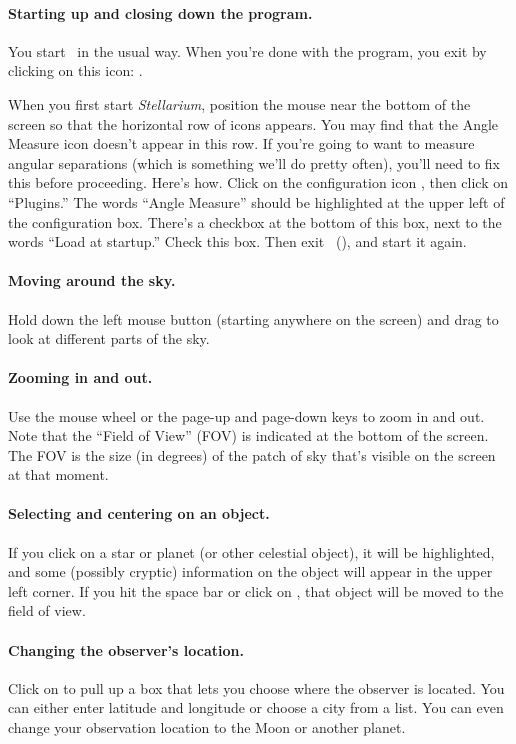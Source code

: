 \paragraph{Starting up and closing down the program.}
You start \stellarium\ in the usual way.
When you're done with the program, you exit by
clicking on this icon: .

When you first start \textit{Stellarium}, position the mouse
near the bottom of the screen so that the horizontal
row of icons appears. You may find that the
Angle Measure icon  doesn't appear in this row.
If you're going to want to measure angular separations (which is
something we'll do pretty often), you'll need to fix this before proceeding.
Here's how. Click on the configuration icon , then click on
``Plugins.'' The words ``Angle Measure'' should be highlighted at the 
upper left of the configuration box. There's a checkbox at the bottom
of this box, next to the words ``Load at startup.'' Check this box.
Then exit \stellarium\ (), and start it again.


\paragraph{Moving around the sky.} Hold down the left mouse button
(starting anywhere on the screen) and drag to look at different parts
of the sky.


\paragraph{Zooming in and out.} Use the mouse wheel or the page-up and 
page-down keys to
zoom in and out. Note that the ``Field of View'' (FOV) is indicated
at the bottom of the screen. The FOV is the size (in degrees) of the
patch of sky that's visible on the screen at that moment.

\paragraph{Selecting and centering on an object.}
If you click on a star or planet (or other celestial object), it will
be highlighted, and some (possibly cryptic) information on
the object will appear in the upper left corner. If you hit the
space bar or click on , that object will be moved to the
field of view.

\paragraph{Changing the observer's location.} Click on 
 to pull up a box that lets you
choose where the observer is located. You can either enter latitude
and longitude or choose a city from a list. You can even change your
observation location to the Moon or another planet.

